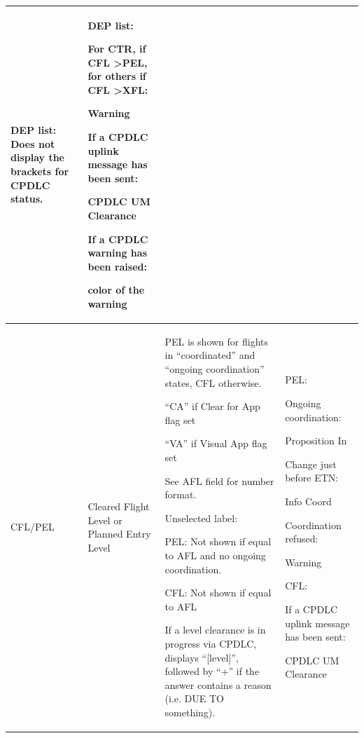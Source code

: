 \documentclass[a4paper,oneside,11pt]{memoir}
\newcounter{rowcounter}
\newcommand{\nextrow}{\refstepcounter{rowcounter}}
\newcommand{\colorref}[1]{\colorbox{Flight Highlight}{\color{#1}#1}}
\begin{document}
\begin{longtable}{|p{2.5cm}|p{2.5cm}|p{4.5cm}|p{4.5cm}|}
      DEP list:
      Does not display the  brackets for CPDLC status. &
      DEP list: 
      
      For CTR, if CFL \textgreater PEL,  for others if CFL \textgreater XFL: 
      
      \colorref{Warning} 
      \bigskip
      
      If a CPDLC uplink message  has been sent: 

      \colorref{CPDLC UM Clearance} 

      \bigskip
      
      If a CPDLC warning has  been raised: 
      
      color of the  warning \\ \hline
    CFL/PEL \nextrow \label{tag:CFL/PEL}&
      Cleared Flight Level or  Planned Entry Level &
      PEL is shown for flights in  “coordinated” and “ongoing coordination” states, CFL otherwise. 
      \bigskip 
      
      “CA” if Clear for App flag set
      
      “VA” if Visual App flag set
      
      See AFL field for number format.
      \bigskip 
      
      Unselected label: 
      
      PEL: Not shown if equal to AFL and no ongoing coordination. 
      
      CFL: Not shown if equal to AFL 
      \bigskip
      
      If a level clearance is in progress via  CPDLC, displays “{[}level{]}”, followed  by “+” if the answer contains a  reason (i.e. DUE TO something). &
      PEL: 
      
      Ongoing coordination:  
      
      \colorref{Proposition In} 

      \bigskip
      
      Change just before ETN: 
      
      \colorref{Info Coord} 

      \bigskip
      
      Coordination refused: 
      
      \colorref{Warning}

      \bigskip 
      
      CFL: 
      
      If a CPDLC uplink message  has been sent:  
      
      \colorref{CPDLC UM Clearance} 


\end{longtable}
\end{document}
